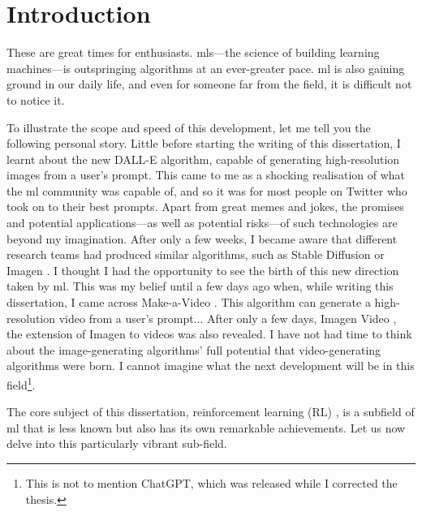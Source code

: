 
\chapter{Introduction}

These are great times for  enthusiasts.
\glspl{ml}---the science of building learning machines---is outspringing algorithms at an ever-greater pace.
\gls{ml} is also gaining ground in our daily life, and even for someone far from the field, it is difficult not to notice it. 

To illustrate the scope and speed of this development, let me tell you the following personal story.
Little before starting the writing of this dissertation, I learnt about the new DALL-E \cite{ramesh2022hierarchical} algorithm, capable of generating high-resolution images from a user's prompt.
This came to me as a shocking realisation of what the \gls{ml} community was capable of, and so it was for most people on Twitter who took on to their best prompts. 
Apart from great memes and jokes, the promises and potential applications---as well as potential risks---of such technologies are beyond my imagination. 
After only a few weeks, I became aware that different research teams had produced similar algorithms, such as Stable Diffusion \cite{rombach2021highresolution} or Imagen \cite{saharia2022photorealistic}.
I thought I had the opportunity to see the birth of this new direction taken by \gls{ml}.
This was my belief until a few days ago when, while writing this dissertation, I came across Make-a-Video \cite{singer2022make}.
This algorithm can generate a high-resolution video from a user's prompt...
After only a few days, Imagen Video \cite{ho2022imagen}, the extension of Imagen to videos was also revealed. 
I have not had time to think about the image-generating algorithms' full potential that video-generating algorithms were born.
I cannot imagine what the next development will be in this field\footnote{This is not to mention ChatGPT, which was released while I corrected the thesis.}. 

The core subject of this dissertation, reinforcement learning (RL) \cite{sutton2018reinforcement}, is a subfield of \gls{ml} that is less known but also has its own remarkable achievements.
Let us now delve into this particularly vibrant sub-field. 




